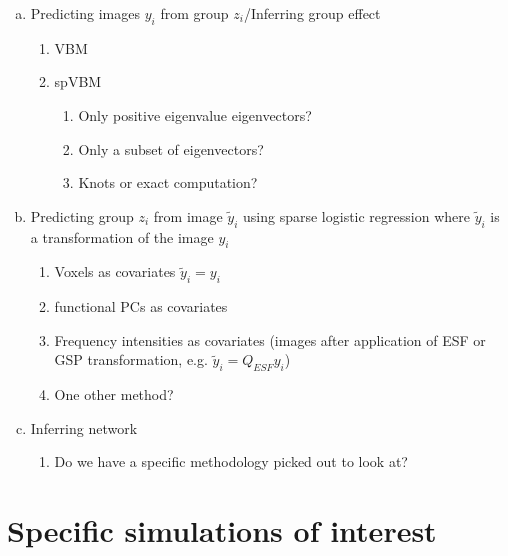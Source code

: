 \documentclass[12pt]{article}
\begin{document}
\begin{enumerate}[(a)]
	\item Predicting images $y_i$ from group $z_i$/Inferring group effect
		\begin{enumerate}[(1)]
			\item VBM
			\item spVBM
			\begin{enumerate}
				\item Only positive eigenvalue eigenvectors?
				\item Only a subset of eigenvectors?
				\item Knots or exact computation?
			\end{enumerate}
		\end{enumerate}
	\item Predicting group $z_i$ from image $\tilde y_i$ using sparse logistic regression where $\tilde y_i$ is a transformation of the image $y_i$
	\begin{enumerate}[(1)]
		\item Voxels as covariates $\tilde y_i=y_i$
		\item functional PCs as covariates
		\item Frequency intensities as covariates (images after application of ESF or GSP transformation, e.g. $\tilde y_i=Q_{ESF}y_i$)
		\item One other method?
	\end{enumerate}
	\item Inferring network
		\begin{enumerate}
			\item Do we have a specific methodology picked out to look at?
		\end{enumerate}
\end{enumerate}



\section*{Specific simulations of interest}
\end{document}
